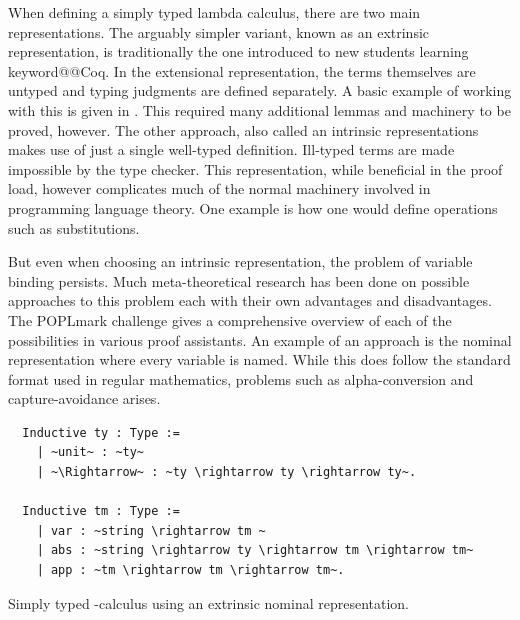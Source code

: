 \documentclass[12pt, final]{article}
\makeatletter
\def\<#1>{\csname keyword@@#1\endcsname}
\makeatother
\begin{document}
When defining a simply typed lambda calculus, there are two main representations\cite{plfa2019}.
The arguably simpler variant, known as an extrinsic representation, is traditionally the one introduced to new students learning \<Coq>.
In the extensional representation, the terms themselves are untyped and typing judgments are defined separately. A basic example of working with this is given in \cite{Pierce:SF2}. This required many additional lemmas and machinery to be proved, however.
The other approach, also called an intrinsic representations makes use of just a single well-typed definition.
Ill-typed terms are made impossible by the type checker.
This representation, while beneficial in the proof load, however complicates much of the normal machinery involved in programming language theory.
One example is how one would define operations such as substitutions.

But even when choosing an intrinsic representation, the problem of variable binding persists.
Much meta-theoretical research has been done on possible approaches to this problem each with their own advantages and disadvantages.
The POPLmark challenge gives a comprehensive overview of each of the possibilities in various proof assistants\cite{Aydemir2005}.
An example of an approach is the nominal representation where every variable is named.
While this does follow the standard format used in regular mathematics, problems such as alpha-conversion and capture-avoidance arises.

\begin{listing}[h]
  \begin{verbatim}
  Inductive ty : Type :=
    | ~unit~ : ~ty~
    | ~\Rightarrow~ : ~ty \rightarrow ty \rightarrow ty~.

  Inductive tm : Type :=
    | var : ~string \rightarrow tm ~
    | abs : ~string \rightarrow ty \rightarrow tm \rightarrow tm~
    | app : ~tm \rightarrow tm \rightarrow tm~.
  \end{verbatim}
  \caption{Simply typed \lambda-calculus using an extrinsic nominal representation.}
  \label{lst:nominal_stlc}
\end{listing}
\end{document}
